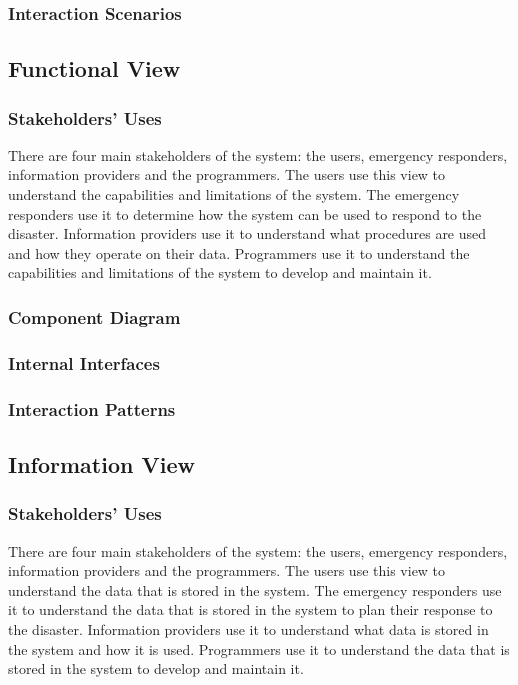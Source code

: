 \documentclass[a4paper]{article}
\begin{document}
    \subsubsection{Interaction Scenarios}
    \lipsum[1-1]
    \subsection{Functional View}
    \subsubsection{Stakeholders' Uses}
    There are four main stakeholders of the system: the users, emergency responders, information providers and the programmers.
    The users use this view to understand the capabilities and limitations of the system. The emergency responders use it to
    determine how the system can be used to respond to the disaster. Information providers use it to understand what procedures
    are used and how they operate on their data. Programmers use it to understand the capabilities and limitations of the system
    to develop and maintain it.
    \subsubsection{Component Diagram}
    \subsubsection{Internal Interfaces}
    \lipsum[1-1]
    \subsubsection{Interaction Patterns}
    \lipsum[1-1]
    \subsection{Information View}
    \subsubsection{Stakeholders' Uses}
    There are four main stakeholders of the system: the users, emergency responders, information providers and the programmers.
    The users use this view to understand the data that is stored in the system. The emergency responders use it to understand
    the data that is stored in the system to plan their response to the disaster. Information providers use it to understand
    what data is stored in the system and how it is used. Programmers use it to understand the data that is stored in the system
    to develop and maintain it.
\end{document}
